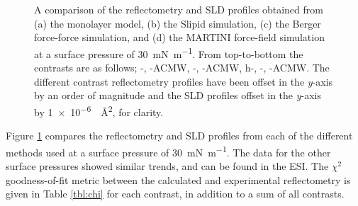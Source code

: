 \documentclass[amsmath,amssymb,twocolumn,superscriptaddress,aps,prl]{revtex4-1}
\begin{document}
\begin{figure}
 \caption{A comparison of the reflectometry and SLD profiles obtained from (a) the monolayer model, (b) the Slipid simulation, (c) the Berger force-force simulation, and (d) the MARTINI force-field simulation at a surface pressure of \SI{30}{\milli\newton\per\meter}. From top-to-bottom the contrasts are as follows; -, -ACMW, -, -ACMW, h-, -, -ACMW. The different contrast reflectometry profiles have been offset in the \emph{y}-axis by an order of magnitude and the SLD profiles offset in the \emph{y}-axis by \SI{1e-6}{\per\square\angstrom}, for clarity.}
 \label{fig:ref}
\end{figure}
%
Figure \ref{fig:ref} compares the reflectometry and SLD profiles from each of the different methods used at a surface pressure of \SI{30}{\milli\newton\per\meter}.
The data for the other surface pressures showed similar trends, and can be found in the ESI.
The $\chi^2$ goodness-of-fit metric between the calculated and experimental reflectometry is given in Table \ref{tbl:chi} for each contrast, in addition to a sum of all contrasts.
%
\end{document}
